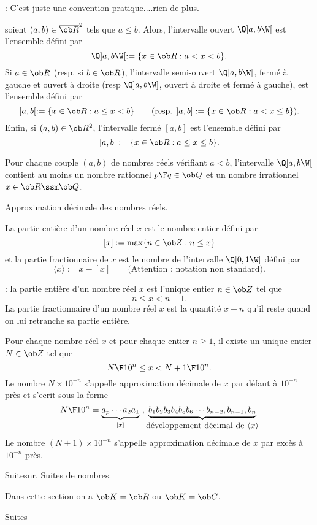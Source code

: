 \Remarque : C'est juste une convention pratique....rien de plus. 
\bigskip

\Definition []  soient $(a,b)\in\overline{ \ob R}^2$ tels que $a\le b$. Alors, l'intervalle ouvert $\Q]a,b\W[$ est l'ensemble d\'efini par 
$$
\Q]a,b\W[:=\{x\in\ob R:a< x< b\}.
$$
Si $a\in\ob R$ (resp. si $b\in\ob R$), l'intervalle semi-ouvert $\Q[a,b\W[$, ferm\'e \`a gauche et ouvert \`a droite (resp $\Q]a,b\W]$, ouvert \`a droite et ferm\'e \`a gauche), est l'ensemble d\'efini par 
$$
[a,b[:=\{x\in\ob R:a\le x< b\}\qquad(\mbox{resp. }]a,b]:=\{x\in\ob R:a < x\le b\}).
$$
Enfin, si $(a,b)\in\ob R^2$, l'intervalle ferm\'e $[a,b]$ est l'ensemble d\'efini par 
$$
[a,b]:=\{x\in\ob R:a\le x\le b\}.
$$


\Propriete []  Pour chaque couple $(a,b)$ de nombres r\'eels v\'erifiant $a< b$, l'intervalle $\Q]a,b\W[$ contient au moins un nombre rationnel ${p\F q}\in\ob Q$ et un nombre irrationnel $x\in\ob R\ssm\ob Q$. 
\bigskip

\Concept [] Approximation d\'ecimale des nombres r\'eels. 

\Definition []  La partie enti\`ere d'un nombre r\'eel $x$ est le nombre entier d\'efini par
$$
[x]:=\max\{n\in\ob Z:n\le x\}
$$
et la partie fractionnaire de $x$ est le nombre de l'intervalle $\Q[0,1\W[$ d\'efini par 
$$
\langle x\rangle:=x-[x]\qquad \mbox{(Attention : notation non standard)}.
$$

\Remarque : la partie enti\`ere d'un nombre r\'eel $x$ est l'unique entier $n\in\ob Z$ tel que 
$$
n\le x< n+1.
$$ 
La partie fractionnaire d'un nombre r\'eel $x$ est la quantit\'e $x-n$ qu'il reste quand on lui retranche sa partie enti\`ere. 
\bigskip

\Propriete []  Pour chaque nombre r\'eel $x$ et pour chaque entier $n\ge1$, il existe un unique entier $N\in\ob Z$ tel que 
$$
{N\F 10^n}\le x< {N+1\F10^n}.
$$ 
Le nombre $N\times10^{-n}$ s'appelle approximation d\'ecimale de $x$ par d\'efaut \`a $10^{-n}$ pr\`es et s'ecrit sous la forme 
$$
{N\F 10^n}=
\underbrace{a_p\cdots a_2a_1}_{[x]}\ ,\underbrace{b_1b_2b_3b_4b_5b_6\cdots b_{n-2},b_{n-1},b_n}_{\mbox{d\'eveloppement d\'ecimal de $\langle x\rangle$}}
$$
Le nombre $(N+1)\times10^{-n}$ s'appelle approximation d\'ecimale de $x$ par exc\`es \`a $10^{-n}$ pr\`es. 

\Section Suitesnr, Suites de nombres.

Dans cette section on a $\ob K=\ob R$ ou $\ob K=\ob C$. 

\Concept [] Suites

